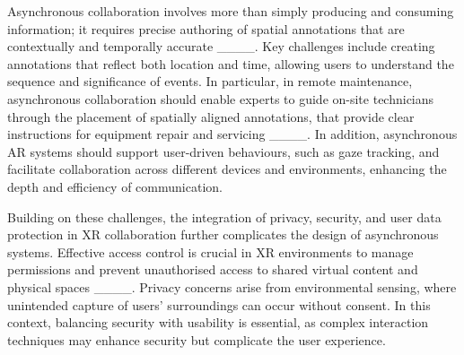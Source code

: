 Asynchronous collaboration involves more than simply producing and consuming information; it requires precise authoring of spatial annotations that are contextually and temporally accurate ____. Key challenges include creating annotations that reflect both location and time, allowing users to understand the sequence and significance of events. In particular, in remote maintenance, asynchronous collaboration should enable experts to guide on-site technicians through the placement of spatially aligned annotations, that provide clear instructions for equipment repair and servicing ____. In addition, asynchronous AR systems should support user-driven behaviours, such as gaze tracking, and facilitate collaboration across different devices and environments, enhancing the depth and efficiency of communication.

Building on these challenges, the integration of privacy, security, and user data protection in XR collaboration further complicates the design of asynchronous systems. Effective access control is crucial in XR environments to manage permissions and prevent unauthorised access to shared virtual content and physical spaces ____. Privacy concerns arise from environmental sensing, where unintended capture of users' surroundings can occur without consent. In this context, balancing security with usability is essential, as complex interaction techniques may enhance security but complicate the user experience.